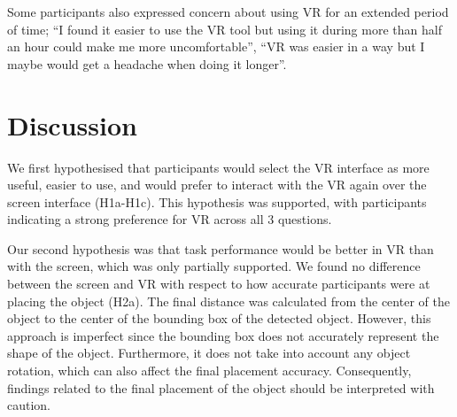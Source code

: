 \documentclass[letterpaper, 10 pt, conference]{ieeeconf}  %
\begin{document}






Some participants also expressed concern about using VR for an extended period of time; ``I found it easier to use the VR tool but using it during more than half an hour could make me more uncomfortable'', ``VR was easier in a way but I maybe would get a headache when doing it longer''.


\section{Discussion}
\label{sec:diss}
We first hypothesised that participants would select the VR interface as more useful, easier to use, and would prefer to interact with the VR again over the screen interface (H1a-H1c). This hypothesis was supported, with participants indicating a strong preference for VR across all 3 questions.

Our second hypothesis was that task performance would be better in VR than with the screen, which was only partially supported. We found no difference between the screen and VR with respect to how accurate participants were at placing the object (H2a). The final distance was calculated from the center of the object to the center of the bounding box of the detected object. However, this approach is imperfect since the bounding box does not accurately represent the shape of the object. Furthermore, it does not take into account any object rotation, which can also affect the final placement accuracy. Consequently, findings related to the final placement of the object should be interpreted with caution. 

\end{document}
